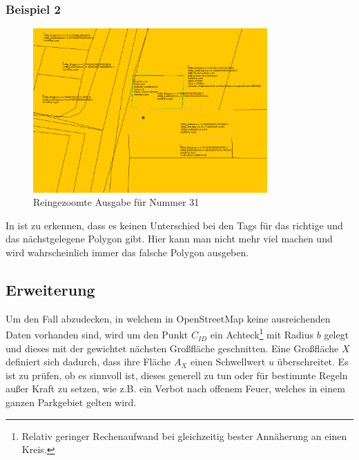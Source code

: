 \subsubsection{Beispiel 2}
\begin{figure}
 \centering
 \includegraphics[width=0.8\textwidth]{DataFailZoom.png}
 \caption{Reingezoomte Ausgabe für Nummer 31}
 \label{fig:DataFailZoom}
\end{figure}
In  ist zu erkennen, dass es keinen Unterschied bei den Tags für das richtige und das nächstgelegene Polygon gibt.
Hier kann man nicht mehr viel machen und wird wahrscheinlich immer das falsche Polygon ausgeben.


\subsection{Erweiterung}
Um den Fall abzudecken, in welchem in OpenStreetMap keine ausreichenden Daten vorhanden sind, wird um den Punkt $C_{ID}$ ein
Achteck\footnote{Relativ geringer Rechenaufwand bei gleichzeitig bester Annäherung an einen Kreis.} mit Radius $b$ gelegt
und dieses mit der gewichtet nächsten Großfläche geschnitten.
Eine Großfläche $X$ definiert sich dadurch, dass ihre Fläche $A_X$ einen Schwellwert $u$ überschreitet.
Es ist zu prüfen, ob es sinnvoll ist, dieses generell zu tun oder für bestimmte Regeln außer Kraft zu setzen, wie
z.B. ein Verbot nach offenem Feuer, welches in einem ganzen Parkgebiet gelten wird.
